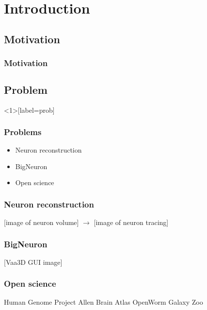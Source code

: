 \documentclass[%
        hyperref={%
                pdfauthor={Zakariyya Mughal},%
                pdfpagemode={None},pdfpagelayout={SinglePage}},%
        xcolor={x11names}%
]{beamer}
\begin{document}

\frame{\titlepage}


\section{Introduction}
\subsection{Motivation}
\begin{frame}
\frametitle{Motivation}
\end{frame}

\subsection{Problem}
\begin{frame}<1>[label=prob]\frametitle{Problems}
\begin{itemize}
	\item<1-> Neuron reconstruction
	\item<2-> BigNeuron
	\item<3-> Open science
\end{itemize}
\end{frame}

\begin{frame}\frametitle{Neuron reconstruction}
	[image of neuron volume]
	$\rightarrow$
	[image of neuron tracing]
\end{frame}


\begin{frame}\frametitle{BigNeuron}
	[Vaa3D GUI image]
\end{frame}


\begin{frame}\frametitle{Open science}
	Human Genome Project
	Allen Brain Atlas
	OpenWorm
	Galaxy Zoo
\end{frame}
\end{document}
